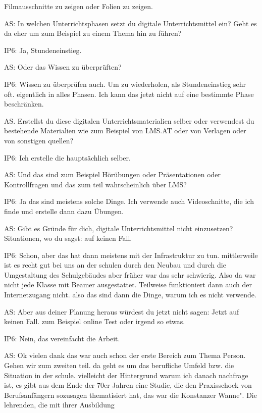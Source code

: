 \documentclass[fontsize=11pt,paper=a4]{scrbook}
\begin{document}
{\begin{itemize*}
Filmausschnitte zu zeigen oder Folien zu
zeigen.
\item[AS:] In welchen Unterrichtsphasen setzt du digitale Unterrichtsmittel ein? Geht es da eher um zum Beispiel zu einem Thema hin zu führen?
\item[IP6:] Ja, Stundeneinstieg.
\item[AS:] Oder das Wissen zu überprüften?
\item[IP6:] Wissen zu überprüfen auch. Um zu wiederholen, als Stundeneinstieg sehr oft.
eigentlich in alles Phasen. Ich kann das
jetzt nicht auf eine bestimmte Phase
beschränken.
\item[AS.] Erstellst du diese digitalen
Unterrichtsmaterialien selber oder
verwendest du bestehende Materialien
wie zum Beispiel von LMS.AT oder von Verlagen oder von sonstigen
quellen?
\item[IP6:] Ich erstelle die hauptsächlich selber.
\item[AS:] Und das sind zum Beispiel Hörübungen oder
Präsentationen oder Kontrollfragen und
das zum teil wahrscheinlich über LMS?
\item[IP6:] Ja das sind meistens solche Dinge. Ich verwende auch Videoschnitte, die ich finde und erstelle dann dazu Übungen.
\item[AS:] Gibt es Gründe für dich, digitale Unterrichtsmittel nicht einzusetzen? Situationen, wo du sagst: auf keinen Fall.
\item[IP6:] Schon, aber das hat dann meistens mit der Infrastruktur zu tun.
mittlerweile ist es recht gut bei uns an der schulen durch den Neubau und durch die Umgestaltung des Schulgebäudes
aber früher war das sehr schwierig. Also
da war nicht jede Klasse mit Beamer ausgestattet. Teilweise
funktioniert dann auch der
Internetzugang nicht.
also das sind dann die Dinge, warum ich es nicht verwende.
\item[AS:] Aber aus deiner Planung heraus würdest du jetzt nicht
sagen: Jetzt auf keinen Fall. zum
Beispiel online Test oder irgend so etwas.
\item[IP6:] Nein, das vereinfacht die Arbeit.
\item[AS:] Ok vielen dank das war
auch schon der erste Bereich zum Thema Person. Gehen wir zum zweiten teil.
da geht es um das berufliche Umfeld bzw.
die Situation in der schule. vielleicht
der Hintergrund warum ich danach nachfrage
ist, es gibt aus dem Ende der 70er Jahren eine Studie,
die den Praxisschock von Berufsanfängern
sozusagen thematisiert hat, das war die
Konstanzer Wanne".  Die
lehrenden, die mit ihrer Ausbildung

\end{itemize*}}
\end{document}
